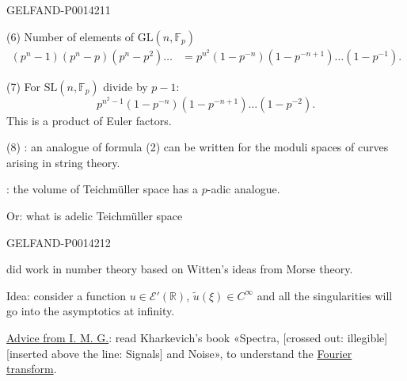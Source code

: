 \begin{GelfandAdjacentEvidence}{GELFAND-P001421}{1}

(6) Number of elements of \(\mathrm{GL}(n,\mathbb F_p)\)
\[
\begin{aligned}
 (p^n-1)(p^n-p)(p^n-p^2)\ldots
 &=
 p^{n^2}(1-p^{-n})(1-p^{-n+1})\ldots(1-p^{-1}).
\end{aligned}
\]

(7) For \(\mathrm{SL}(n,\mathbb F_p)\) divide by \(p-1\):
\[
 p^{n^2-1}(1-p^{-n})(1-p^{-n+1})\ldots(1-p^{-2}).
\]
This is a product of Euler factors.

(8) : an analogue of formula (2) can be written for the moduli spaces of curves arising in string theory.


: the volume of Teichmüller space has a \(p\)-adic analogue.

Or: what is adelic Teichmüller space

\end{GelfandAdjacentEvidence}
\begin{GelfandAdjacentEvidence}{GELFAND-P001421}{2}


 did work in number theory based on Witten’s ideas from Morse theory.

Idea: consider a function \(u\in\mathcal E'(\mathbb R)\),
\(\widetilde u(\xi)\in C^\infty\) and all the singularities will go into the asymptotics at infinity.

\uline{Advice from I. M. G.}: read Kharkevich’s book «Spectra,
[crossed out: illegible] [inserted above the line: Signals] and Noise»,
to understand the \uline{Fourier transform}.
\end{GelfandAdjacentEvidence}
